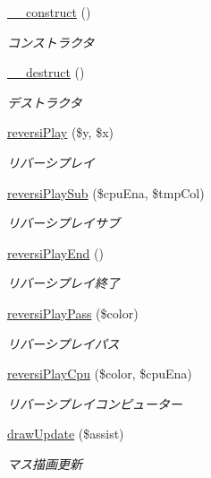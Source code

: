 \begin{DoxyCompactItemize}
\item 
\hyperlink{class_reversi_play_a095c5d389db211932136b53f25f39685}{\+\_\+\+\_\+construct} ()
\begin{DoxyCompactList}\small\item\em コンストラクタ \end{DoxyCompactList}\item 
\hyperlink{class_reversi_play_a421831a265621325e1fdd19aace0c758}{\+\_\+\+\_\+destruct} ()
\begin{DoxyCompactList}\small\item\em デストラクタ \end{DoxyCompactList}\item 
\hyperlink{class_reversi_play_a8c229d4a0cfa72f4e9605042486d58f2}{reversi\+Play} (\$y, \$x)
\begin{DoxyCompactList}\small\item\em リバーシプレイ \end{DoxyCompactList}\item 
\hyperlink{class_reversi_play_a990fc6e45b7bdf2dab569f087f8b5a62}{reversi\+Play\+Sub} (\$cpu\+Ena, \$tmp\+Col)
\begin{DoxyCompactList}\small\item\em リバーシプレイサブ \end{DoxyCompactList}\item 
\hyperlink{class_reversi_play_af55fe6b6f2005c7da80c696ed692783d}{reversi\+Play\+End} ()
\begin{DoxyCompactList}\small\item\em リバーシプレイ終了 \end{DoxyCompactList}\item 
\hyperlink{class_reversi_play_a67816fe65a87e35d8e8cc35d5d269bcb}{reversi\+Play\+Pass} (\$color)
\begin{DoxyCompactList}\small\item\em リバーシプレイパス \end{DoxyCompactList}\item 
\hyperlink{class_reversi_play_a6514ad9244af720ee1ec1777c11e80fb}{reversi\+Play\+Cpu} (\$color, \$cpu\+Ena)
\begin{DoxyCompactList}\small\item\em リバーシプレイコンピューター \end{DoxyCompactList}\item 
\hyperlink{class_reversi_play_a52029e5f2e049767d1f67c3f5c18ce9f}{draw\+Update} (\$assist)
\begin{DoxyCompactList}\small\item\em マス描画更新 \end{DoxyCompactList}\item 

\end{DoxyCompactItemize}
